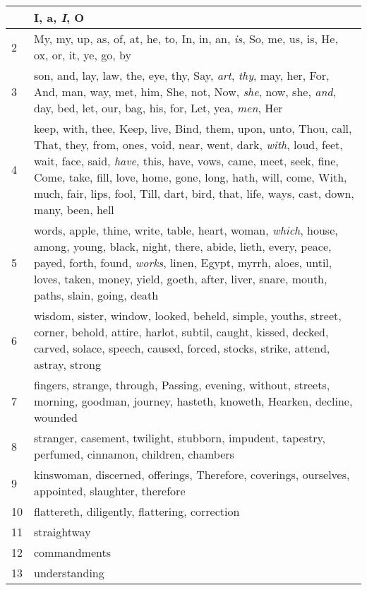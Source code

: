 \begin{center}
\begin{longtable}{l|p{3.75in}}
\hline \hline 
\endlastfoot 
1 & I, a, \emph{I}, O\\ \hline 
2 & My, my, up, as, of, at, he, to, In, in, an, \emph{is}, So, me, us, is, He, ox, or, it, ye, go, by\\ \hline 
3 & son, and, lay, law, the, eye, thy, Say, \emph{art}, \emph{thy}, may, her, For, And, man, way, met, him, She, not, Now, \emph{she}, now, she, \emph{and}, day, bed, let, our, bag, his, for, Let, yea, \emph{men}, Her\\ \hline 
4 & keep, with, thee, Keep, live, Bind, them, upon, unto, Thou, call, That, they, from, ones, void, near, went, dark, \emph{with}, loud, feet, wait, face, said, \emph{have}, this, have, vows, came, meet, seek, fine, Come, take, fill, love, home, gone, long, hath, will, come, With, much, fair, lips, fool, Till, dart, bird, that, life, ways, cast, down, many, been, hell\\ \hline 
5 & words, apple, thine, write, table, heart, woman, \emph{which}, house, among, young, black, night, there, abide, lieth, every, peace, payed, forth, found, \emph{works}, linen, Egypt, myrrh, aloes, until, loves, taken, money, yield, goeth, after, liver, snare, mouth, paths, slain, going, death\\ \hline 
6 & wisdom, sister, window, looked, beheld, simple, youths, street, corner, behold, attire, harlot, subtil, caught, kissed, decked, carved, solace, speech, caused, forced, stocks, strike, attend, astray, strong\\ \hline 
7 & fingers, strange, through, Passing, evening, without, streets, morning, goodman, journey, hasteth, knoweth, Hearken, decline, wounded\\ \hline 
8 & stranger, casement, twilight, stubborn, impudent, tapestry, perfumed, cinnamon, children, chambers\\ \hline 
9 & kinswoman, discerned, offerings, Therefore, coverings, ourselves, appointed, slaughter, therefore\\ \hline 
10 & flattereth, diligently, flattering, correction\\ \hline 
11 & straightway\\ \hline 
12 & commandments\\ \hline 
13 & understanding\\ \hline 
\end{longtable} 
\end{center} 




 
